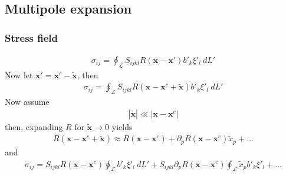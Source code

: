 \subsection{Multipole expansion}

\subsubsection{Stress field}
\begin{align}
\sigma_{ij}=\oint_\mathcal{L}S_{ijkl}R(\mathbf x-\mathbf x')b'_k\xi'_l\ dL'
\end{align}
Now let $\mathbf{x'}=\mathbf{x}^c-\tilde{\mathbf{x}}$, then
\begin{align}
\sigma_{ij}=\oint_\mathcal{L}S_{ijkl}R(\mathbf x-\mathbf x^c+\tilde{\mathbf{x}})b'_k\xi'_l\ dL'
\end{align}
Now assume 
\begin{align}
|\tilde{\mathbf{x}}|\ll |\mathbf x-\mathbf x^c|
\end{align}
then, expanding $R$ for $\tilde{\mathbf{x}}\rightarrow0$ yields
\begin{align}
R(\mathbf x-\mathbf x^c+\tilde{\mathbf{x}})\approx R(\mathbf x-\mathbf x^c)+\partial_pR(\mathbf x-\mathbf x^c)\tilde{x}_p+\ldots
\end{align}
and
\begin{align}
\sigma_{ij}=S_{ijkl}R(\mathbf x-\mathbf x^c)\oint_\mathcal{L}b'_k\xi'_l\ dL'+S_{ijkl}\partial_pR(\mathbf x-\mathbf x^c)\oint_\mathcal{L}\tilde{x}_pb'_k\xi'_l+\ldots
\end{align}

